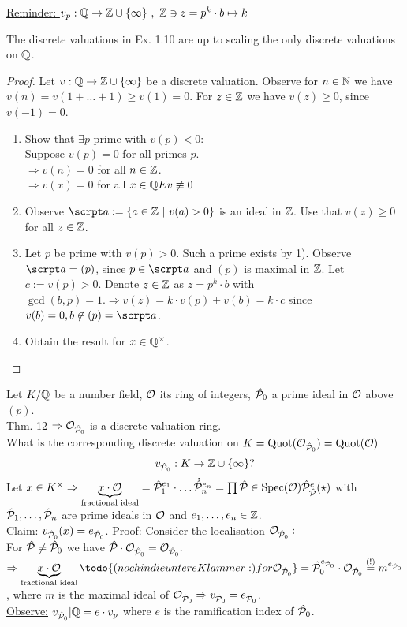 
\underline{Reminder: }
$v_p: \mathbb{Q} \to \mathbb{Z} \cup \{\infty\} \ , \ \mathbb{Z} \ni z =p^k\cdot b \mapsto k$

\begin{Prop}
The discrete valuations in Ex. 1.10 are up to scaling the only discrete valuations on $\mathbb{Q}$.
\end{Prop}

\begin{proof}
Let $v: \mathbb{Q} \to \mathbb{Z} \cup \{\infty\}$ be a discrete valuation. Observe for $n \in \mathbb{N}$ we have $v(n)=v(1+\dots +1) \geq v(1)=0$. For $z \in \mathbb{Z}$ we have $v(z)\geq 0$, since $v(-1)=0$.
\begin{enumerate}[1)]
\item Show that $\exists p$ prime with $v(p)<0$:\\
Suppose $v(p)=0$ for all primes $p$.\\
$\Rightarrow v(n)=0$ for all $n \in \mathbb{Z}$.\\
$\Rightarrow v(x)=0$ for all $x \in \Q \Lightning v \not \equiv 0$
\item Observe $\a:=\{a \in \Z \ | \ v(a) >0 \}$ is an ideal in $\mathbb{Z}$. Use that $v(z) \geq 0$ for all $z\in \mathbb{Z}$.
\item Let $p$ be prime with $v(p) >0$. Such a prime exists by 1). Observe $\a=(p)$, since $p \in \a$ and $(p)$ is maximal in $\mathbb{Z}$. Let $c:=v(p)>0$. Denote $z \in \mathbb{Z}$ as $z=p^k\cdot b$ with $\gcd(b,p)=1. \Rightarrow v(z)=k \cdot v(p) + v(b) = k\cdot c$ since $v(b)=0, b\not \in (p) = \a$.
\item Obtain the result for $x \in \mathbb{Q}^\times$.
\end{enumerate}
\end{proof}

\begin{Bsp}
Let $K/\mathbb{Q}$ be a number field, $\mathcal{O}$ its ring of integers, $\hat{\mathcal{P}}_0$ a prime ideal in $\mathcal{O}$ above $(p)$.\\
Thm. 12 $\Rightarrow \mathcal{O}_{\hat{\mathcal{P}}_0}$ is a discrete valuation ring.\\
What is the corresponding discrete valuation on $K=\operatorname{Quot}(\mathcal{O}_{\hat{\mathcal{P}}_0})=\operatorname{Quot}(\mathcal{O})$
\[v_{\hat{\mathcal{P}}_0}: K \to \mathbb{Z} \cup \{\infty\} ?\]Let $x \in K^\times \Rightarrow \underbrace{x \cdot \mathcal{O}}_{\text{fractional ideal}}=\hat{\mathcal{P}}^{e_1}_1 \cdot \ldots \dot {\hat{\mathcal{P}}}^{e_n}_n = \prod \hat{\mathcal{P}} \in \operatorname{Spec}(\mathcal{O}) \hat{\mathcal{P}}^e_{\hat{\mathcal{P}}} (\star)$ with $\hat{\mathcal{P}}_1, \ldots, \hat{\mathcal{P}}_n$ are prime ideals in $\mathcal{O}$ and $e_1, \ldots, e_n \in \mathbb{Z}$.\\
\underline{Claim:} $v_{\hat{\mathcal{P}}_0}(x)=e_{\hat{\mathcal{P}}_0}$.
\underline{Proof:} Consider the localisation $\mathcal{O}_{\hat{\mathcal{P}}_0}:$\\

For $\hat{\mathcal{P}} \neq \hat{\mathcal{P}}_0$ we have $\hat{\mathcal{P}} \cdot \mathcal{O}_{\hat{\mathcal{P}}_0} = \mathcal{O}_{\hat{\mathcal{P}}_0}.$\\
$\Rightarrow \underbrace{x \cdot \O}_{\text{fractional ideal}}
\todo{(noch in die untere Klammer:) for \O_{\hP_0}}
 = \hP^{e_{\hP_0}}_0 \cdot \O_{\hP_0} \stackrel{(!)}{=}m^{e_{\hP_0}}$, where $m$ is the maximal ideal of $\mathcal{O}_{\hat{\mathcal{P}}_0} \Rightarrow v_{\hat{\mathcal{P}}_0} = e_{\hat{\mathcal{P}}_0}$.\\
\underline{Observe:} $v_{\hat{\mathcal{P}}_0}|\mathbb{Q}=e\cdot v_p$ where $e$ is the ramification index of $\hat{\mathcal{P}}_0$.
\end{Bsp}

